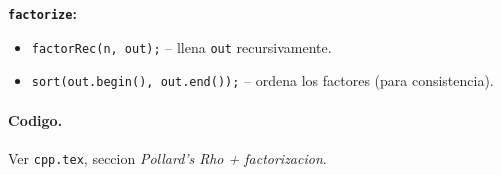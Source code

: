 \textbf{\texttt{factorize}:}
\begin{itemize}\setlength\itemsep{0pt}
	\item \verb|factorRec(n, out);| -- llena \texttt{out} recursivamente.
	\item \verb|sort(out.begin(), out.end());| -- ordena los factores (para consistencia).

\end{itemize}

\paragraph{Codigo.}
Ver \texttt{cpp.tex}, seccion \textit{Pollard's Rho + factorizacion}.

\vspace{0.5em|||}
